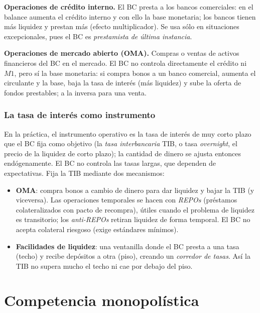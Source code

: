 \documentclass[11pt]{article}
\theoremstyle{definition}
\begin{document}
\textbf{Operaciones de crédito interno.} El BC presta a los bancos comerciales: en el balance aumenta
el crédito interno y con ello la base monetaria; los bancos tienen más liquidez y prestan más (efecto
multiplicador). Se usa sólo en situaciones excepcionales, pues el BC es \emph{prestamista de última
instancia}.

\textbf{Operaciones de mercado abierto (OMA).} Compras o ventas de activos financieros del BC en el
mercado. El BC no controla directamente el crédito ni $M1$, pero sí la base monetaria: si compra bonos
a un banco comercial, aumenta el circulante y la base, baja la tasa de interés (más liquidez) y sube la
oferta de fondos prestables; a la inversa para una venta.

\subsubsection{La tasa de interés como instrumento}

En la práctica, el instrumento operativo es la tasa de interés de muy corto plazo que el BC fija como
objetivo (la \emph{tasa interbancaria} TIB, o tasa \emph{overnight}, el precio de la liquidez de corto
plazo); la cantidad de dinero se ajusta entonces endógenamente. El BC no controla las tasas largas,
que dependen de expectativas. Fija la TIB mediante dos mecanismos:
\begin{itemize}[leftmargin=1.4em]
\item \textbf{OMA}: compra bonos a cambio de dinero para dar liquidez y bajar la TIB (y viceversa). Las
operaciones temporales se hacen con \emph{REPOs} (préstamos colateralizados con pacto de recompra),
útiles cuando el problema de liquidez es transitorio; los \emph{anti-REPOs} retiran liquidez de forma
temporal. El BC no acepta colateral riesgoso (exige estándares mínimos).
\item \textbf{Facilidades de liquidez}: una ventanilla donde el BC presta a una tasa (techo) y recibe
depósitos a otra (piso), creando un \emph{corredor de tasas}. Así la TIB no supera mucho el techo ni
cae por debajo del piso.
\end{itemize}

\section{Competencia monopolística}
\end{document}
